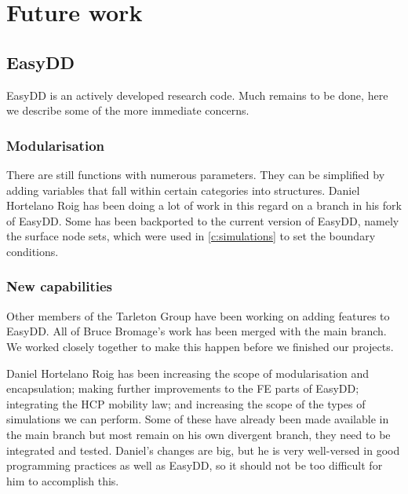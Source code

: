 \chapter{Future work}
\label{c:future}

\section{EasyDD}

EasyDD is an actively developed research code. Much remains to be done, here we describe some of the more immediate concerns.

\subsection{Modularisation}

There are still functions with numerous parameters. They can be simplified by adding variables that fall within certain categories into structures. Daniel Hortelano Roig has been doing a lot of work in this regard on a branch in his fork of EasyDD. Some has been backported to the current version of EasyDD, namely the surface node sets, which were used in \cref{c:simulations} to set the boundary conditions.

\subsection{New capabilities}

Other members of the Tarleton Group have been working on adding features to EasyDD. All of Bruce Bromage's work has been merged with the main branch. We worked closely together to make this happen before we finished our projects.

Daniel Hortelano Roig has been increasing the scope of modularisation and encapsulation; making further improvements to the FE parts of EasyDD; integrating the HCP mobility law; and increasing the scope of the types of simulations we can perform. Some of these have already been made available in the main branch but most remain on his own divergent branch, they need to be integrated and tested. Daniel's changes are big, but he is very well-versed in good programming practices as well as EasyDD, so it should not be too difficult for him to accomplish this.

